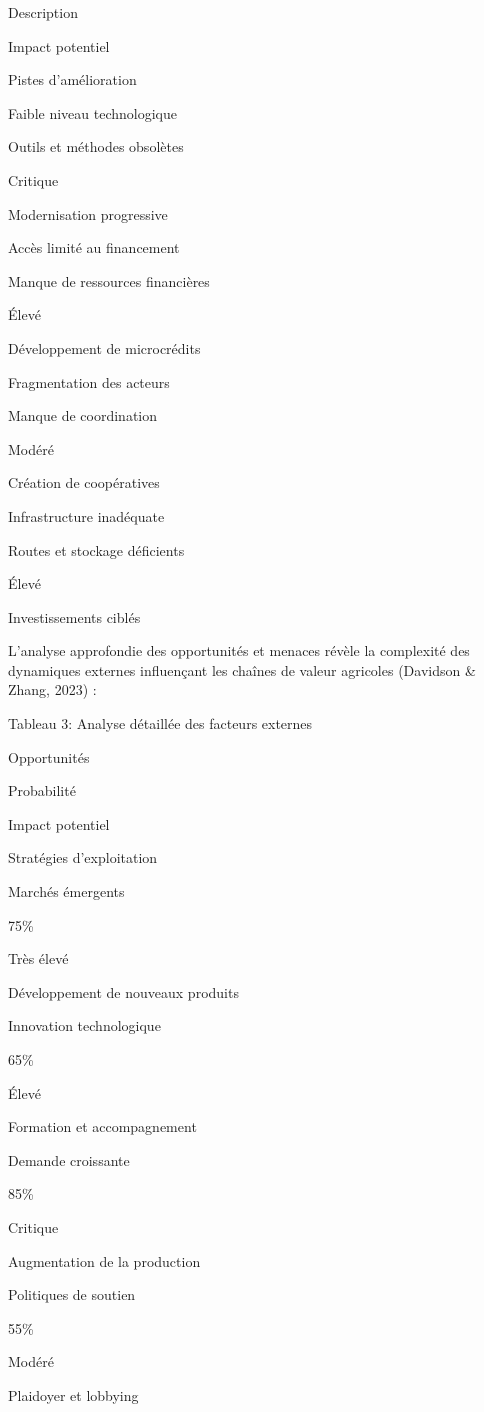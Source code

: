 \documentclass[12pt,oneside]{report}
\begin{document}
Description

Impact potentiel

Pistes d'amélioration

Faible niveau technologique

Outils et méthodes obsolètes

Critique

Modernisation progressive

Accès limité au financement

Manque de ressources financières

Élevé

Développement de microcrédits

Fragmentation des acteurs

Manque de coordination

Modéré

Création de coopératives

Infrastructure inadéquate

Routes et stockage déficients

Élevé

Investissements ciblés

L'analyse approfondie des opportunités et menaces révèle la complexité des dynamiques externes influençant les chaînes de valeur agricoles (Davidson \& Zhang, 2023) :

Tableau 3: Analyse détaillée des facteurs externes

Opportunités

Probabilité

Impact potentiel

Stratégies d'exploitation

Marchés émergents

75\%

Très élevé

Développement de nouveaux produits

Innovation technologique

65\%

Élevé

Formation et accompagnement

Demande croissante

85\%

Critique

Augmentation de la production

Politiques de soutien

55\%

Modéré

Plaidoyer et lobbying
\end{document}
